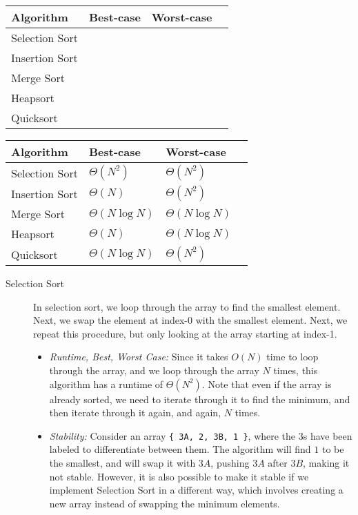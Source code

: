 \ifprintanswers\else
{
\renewcommand{\arraystretch}{2}
\setlength{\tabcolsep}{12pt}
\begin{tabularx}{\textwidth}{Xlll}
Algorithm         & Best-case & Worst-case \\\hline
Selection Sort    &    &    \\
Insertion Sort    &    &   \\
Merge Sort        &    &    \\
Heapsort          &    &    \\
Quicksort         &    &    
\end{tabularx}
}
\fi

\begin{solution}
\renewcommand{\arraystretch}{2}
\setlength{\tabcolsep}{12pt}
\begin{tabularx}{\textwidth}{Xlll}
Algorithm         & Best-case          & Worst-case          \\\hline
Selection Sort    & $\Theta(N^2)$      & $\Theta(N^2)$ \\
Insertion Sort    & $\Theta(N)$        & $\Theta(N^2)$  \\
Merge Sort        & $\Theta(N \log N)$ & $\Theta(N \log N)$ \\
Heapsort          & $\Theta(N)$        & $\Theta(N \log N)$ \\
Quicksort         & $\Theta(N \log N)$        & $\Theta(N^2)$  
\end{tabularx}
\begin{description}
\item[Selection Sort] In selection sort, we loop through the array to find the smallest element.
Next, we swap the element at index-0 with the smallest element. Next, we repeat
this procedure, but only looking at the array starting at index-1.
\begin{itemize}
\item \textit{Runtime, Best, Worst Case:} Since it takes $O(N)$ time to loop
through the array, and we loop through the array $N$ times, this algorithm has
a runtime of $\Theta(N^2)$. Note that even if the array is already sorted, we
need to iterate through it to find the minimum, and then iterate through it
again, and again, $N$ times.
\item \textit{Stability:} Consider an array \lstinline${ 3A, 2, 3B, 1 }$, where
the $3$s have been labeled to differentiate between them. The algorithm will
find $1$ to be the smallest, and will swap it with $3A$, pushing $3A$ after
$3B$, making it not stable. However, it is also possible to make it stable if
we implement Selection Sort in a different way, which involves creating a new
array instead of swapping the minimum elements.
\end{itemize}


\end{description}
\end{solution}
